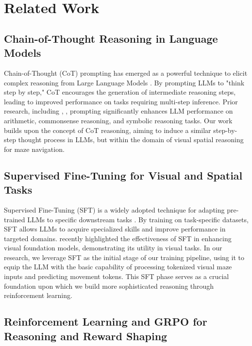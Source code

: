 \section{Related Work}
\label{sec:related_work}

\subsection{Chain-of-Thought Reasoning in Language Models}

Chain-of-Thought (CoT) prompting has emerged as a powerful technique to elicit complex reasoning from Large Language Models \citep{Wei2022ChainofThought}. By prompting LLMs to "think step by step," CoT encourages the generation of intermediate reasoning steps, leading to improved performance on tasks requiring multi-step inference. Prior research, including \citet{Wei2022ChainofThought}, \cite{wei2023chainofthoughtpromptingelicitsreasoning}, \cite{wang-etal-2023-towards} prompting significantly enhances LLM performance on arithmetic, commonsense reasoning, and symbolic reasoning tasks. Our work builds upon the concept of CoT reasoning, aiming to induce a similar step-by-step thought process in LLMs, but within the domain of visual spatial reasoning for maze navigation.

\subsection{Supervised Fine-Tuning for Visual and Spatial Tasks}

Supervised Fine-Tuning (SFT) is a widely adopted technique for adapting pre-trained LLMs to specific downstream tasks \citep{wei2022finetunedlanguagemodelszeroshot}. By training on task-specific datasets, SFT allows LLMs to acquire specialized skills and improve performance in targeted domains.  \citet{jiang2024supervisedfinetuningturnimproves} recently highlighted the effectiveness of SFT in enhancing visual foundation models, demonstrating its utility in visual tasks.  In our research, we leverage SFT as the initial stage of our training pipeline, using it to equip the LLM with the basic capability of processing tokenized visual maze inputs and predicting movement tokens.  This SFT phase serves as a crucial foundation upon which we build more sophisticated reasoning through reinforcement learning.

\subsection{Reinforcement Learning and GRPO for Reasoning and Reward Shaping}

